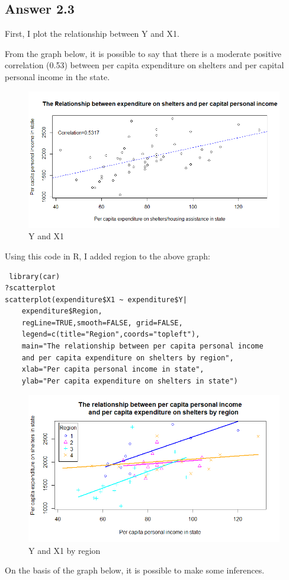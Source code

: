 \documentclass{article}
\begin{document}
\pagebreak
\subsection{Answer 2.3}
First, I plot the relationship between Y and X1.

\noindent From the graph below, it is possible to say that there is a moderate positive correlation (0.53) between per capita expenditure on shelters and per capital personal income in the state. 

\begin{figure}[h]
    \centering
    \includegraphics[width=1.3\textwidth]{Y and X1.png}
    \caption{Y and X1}
    \label{fig:enter-label}
\end{figure}

Using this code in R, I added region to the above graph:
\begin{verbatim}
 library(car)
?scatterplot
scatterplot(expenditure$X1 ~ expenditure$Y| 
    expenditure$Region,
    regLine=TRUE,smooth=FALSE, grid=FALSE,
    legend=c(title="Region",coords="topleft"),
    main="The relationship between per capita personal income
    and per capita expenditure on shelters by region",
    xlab="Per capita personal income in state",
    ylab="Per capita expenditure on shelters in state")

\end{verbatim}
\vspace{2cm}

\begin{figure}[h]
    \centering
    \includegraphics[width=1.4\textwidth]{Y and X1 by Region.png}
    \caption{Y and X1 by region}
    \label{fig:enter-label}
\end{figure}
\vspace{0.7cm}
\noindent On the basis of the graph below, it is possible to make some inferences.
\end{document}

